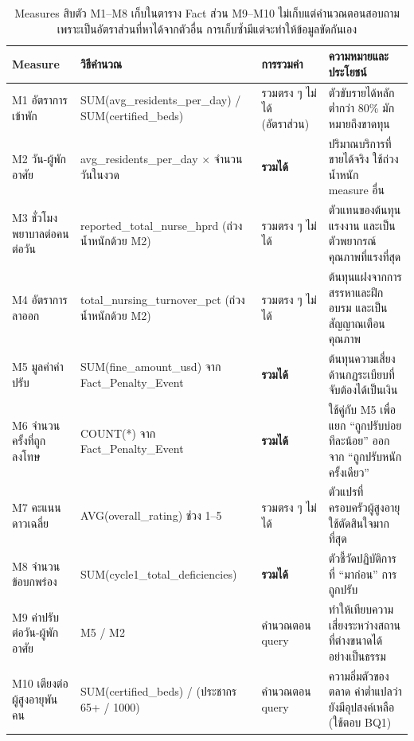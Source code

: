 \documentclass[11pt,a4paper]{article}
\newcommand{\sansall}{\sffamily}
\begin{document}
\begin{table}[H]\centering
\begin{adjustbox}{max width=\linewidth}
\small
\begin{tabular}{L{3.2cm} L{4.6cm} L{2.5cm} L{6.6cm}}
\toprule
\sansall\bfseries Measure & \sansall\bfseries วิธีคำนวณ &
\sansall\bfseries การรวมค่า & \sansall\bfseries ความหมายและประโยชน์ \\
\midrule
M1 อัตราการเข้าพัก & SUM(avg\_residents\_per\_day) / SUM(certified\_beds) &
  รวมตรง ๆ ไม่ได้ (อัตราส่วน) & ตัวขับรายได้หลัก ต่ำกว่า 80\% มักหมายถึงขาดทุน \\
\addlinespace
M2 วัน-ผู้พักอาศัย & avg\_residents\_per\_day $\times$ จำนวนวันในงวด &
  \textbf{รวมได้} & ปริมาณบริการที่ขายได้จริง ใช้ถ่วงน้ำหนัก measure อื่น \\
\addlinespace
M3 ชั่วโมงพยาบาลต่อคนต่อวัน & reported\_total\_nurse\_hprd (ถ่วงน้ำหนักด้วย M2) &
  รวมตรง ๆ ไม่ได้ & ตัวแทนของต้นทุนแรงงาน และเป็นตัวพยากรณ์คุณภาพที่แรงที่สุด \\
\addlinespace
M4 อัตราการลาออก & total\_nursing\_turnover\_pct (ถ่วงน้ำหนักด้วย M2) &
  รวมตรง ๆ ไม่ได้ & ต้นทุนแฝงจากการสรรหาและฝึกอบรม และเป็นสัญญาณเตือนคุณภาพ \\
\addlinespace
M5 มูลค่าค่าปรับ & SUM(fine\_amount\_usd) จาก Fact\_Penalty\_Event &
  \textbf{รวมได้} & ต้นทุนความเสี่ยงด้านกฎระเบียบที่จับต้องได้เป็นเงิน \\
\addlinespace
M6 จำนวนครั้งที่ถูกลงโทษ & COUNT(*) จาก Fact\_Penalty\_Event & \textbf{รวมได้} &
  ใช้คู่กับ M5 เพื่อแยก ``ถูกปรับบ่อยทีละน้อย'' ออกจาก ``ถูกปรับหนักครั้งเดียว'' \\
\addlinespace
M7 คะแนนดาวเฉลี่ย & AVG(overall\_rating) ช่วง 1--5 & รวมตรง ๆ ไม่ได้ &
  ตัวแปรที่ครอบครัวผู้สูงอายุใช้ตัดสินใจมากที่สุด \\
\addlinespace
M8 จำนวนข้อบกพร่อง & SUM(cycle1\_total\_deficiencies) & \textbf{รวมได้} &
  ตัวชี้วัดปฏิบัติการที่ ``มาก่อน'' การถูกปรับ \\
\addlinespace
M9 ค่าปรับต่อวัน-ผู้พักอาศัย & M5 / M2 & คำนวณตอน query &
  ทำให้เทียบความเสี่ยงระหว่างสถานที่ต่างขนาดได้อย่างเป็นธรรม \\
\addlinespace
M10 เตียงต่อผู้สูงอายุพันคน & SUM(certified\_beds) / (ประชากร 65+ / 1000) &
  คำนวณตอน query & ความอิ่มตัวของตลาด ค่าต่ำแปลว่ายังมีอุปสงค์เหลือ (ใช้ตอบ BQ1) \\
\bottomrule
\end{tabular}
\end{adjustbox}
\caption{Measures สิบตัว M1--M8 เก็บในตาราง Fact ส่วน M9--M10 ไม่เก็บแต่คำนวณตอนสอบถาม เพราะเป็นอัตราส่วนที่หาได้จากตัวอื่น การเก็บซ้ำมีแต่จะทำให้ข้อมูลขัดกันเอง}
\end{table}
\end{document}
